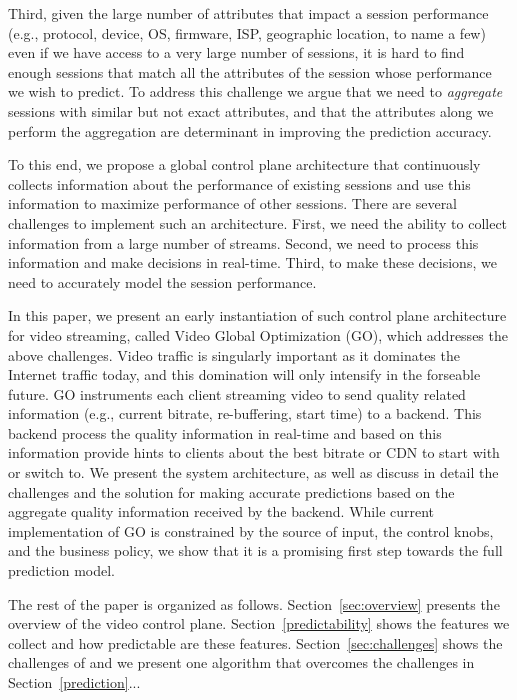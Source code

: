 Third, given the large number of attributes that impact a session performance (e.g., protocol, device, OS, firmware, ISP, geographic location, to name a few) even if we have access to a very large number of sessions, it is hard to find enough sessions that match all the attributes of the session whose performance we wish to predict. To address this challenge we argue that we need to \emph{aggregate} sessions with similar but not exact attributes, and that the attributes along we perform the aggregation are determinant in improving the prediction accuracy.

To this end, we propose a global control plane architecture that continuously collects information about the performance of existing sessions and use this information to maximize performance of other sessions. There are several challenges to implement such an architecture. First, we need the ability to collect information from a large number of streams. Second, we need to process this information and make decisions in real-time. Third, to make these decisions, we need to accurately model the session performance. 

In this paper, we present an early instantiation of such control plane architecture for video streaming, called Video Global Optimization (GO), which addresses the above challenges.  Video traffic is singularly important as it dominates the Internet traffic today, and this domination will only intensify in the forseable future. GO instruments each client streaming video to send quality related information (e.g., current bitrate, re-buffering, start time) to a backend. This backend process the quality information in real-time and based on this information provide hints to clients about the best bitrate or CDN to start with or switch to. We present the system architecture, as well as discuss in detail the challenges and the solution for making accurate predictions based on the aggregate quality information received by the backend. While current implementation of GO is constrained by the source of input, the control knobs, and the business policy, we show that it is a promising first step towards the full prediction model. 
   
The rest of the paper is organized as follows. Section~\ref{sec:overview} presents the overview of the video control plane. Section~\ref{predictability} shows the features we collect and how predictable are these features. Section~\ref{sec:challenges} shows the challenges of and we present one algorithm that overcomes the challenges in Section~\ref{prediction}...

